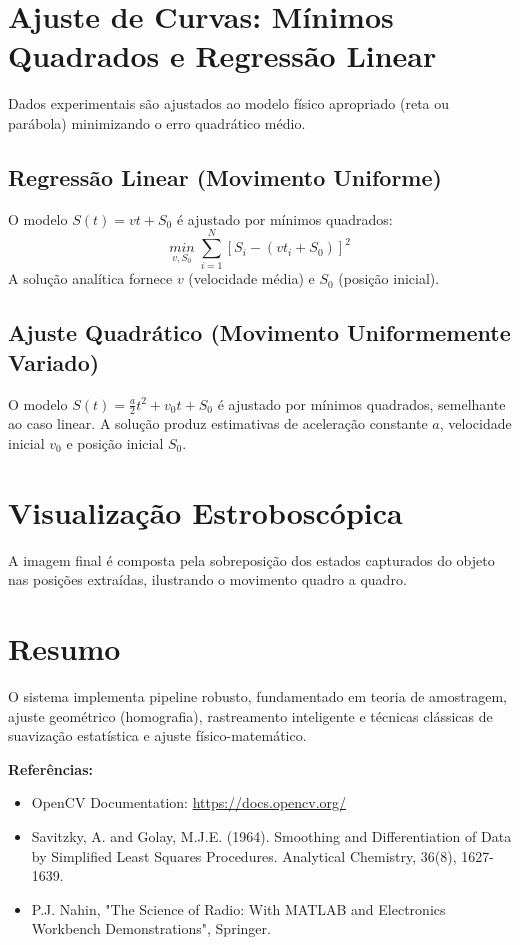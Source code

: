 \section{Ajuste de Curvas: Mínimos Quadrados e Regressão Linear}
Dados experimentais são ajustados ao modelo físico apropriado (reta ou parábola) minimizando o erro quadrático médio.
\subsection{Regressão Linear (Movimento Uniforme)}
\begin{tcolorbox}[title=Regressão Linear]
O modelo $S(t)=vt + S_0$ é ajustado por mínimos quadrados:
\begin{equation}
    \underset{v,S_0}{min} \; \sum_{i=1}^N [S_i-(v t_i + S_0)]^2
\end{equation}
A solução analítica fornece $v$ (velocidade média) e $S_0$ (posição inicial).
\end{tcolorbox}
\subsection{Ajuste Quadrático (Movimento Uniformemente Variado)}
\begin{tcolorbox}[title=Regressão Quadrática]
O modelo $S(t)=\frac{a}{2}t^2+v_0t+S_0$ é ajustado por mínimos quadrados, semelhante ao caso linear.
A solução produz estimativas de aceleração constante $a$, velocidade inicial $v_0$ e posição inicial $S_0$.
\end{tcolorbox}

\section{Visualização Estroboscópica}
A imagem final é composta pela sobreposição dos estados capturados do objeto nas posições extraídas, ilustrando o movimento quadro a quadro.

\section{Resumo}
O sistema implementa pipeline robusto, fundamentado em teoria de amostragem, ajuste geométrico (homografia), rastreamento inteligente e técnicas clássicas de suavização estatística e ajuste físico-matemático.

\bigskip
\noindent
\textbf{Referências:}
\begin{itemize}
    \item OpenCV Documentation: \url{https://docs.opencv.org/}
    \item Savitzky, A. and Golay, M.J.E. (1964). Smoothing and Differentiation of Data by Simplified Least Squares Procedures. Analytical Chemistry, 36(8), 1627-1639.
    \item P.J. Nahin, "The Science of Radio: With MATLAB and Electronics Workbench Demonstrations", Springer.
\end{itemize}

